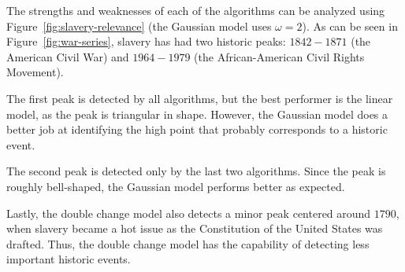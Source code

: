 The strengths and weaknesses of each of the algorithms can be analyzed using Figure~\ref{fig:slavery-relevance} (the Gaussian model uses $\omega = 2$). As can be seen in Figure~\ref{fig:war-series}, slavery has had two historic peaks: $1842 - 1871$ (the American Civil War) and $1964 - 1979$ (the African-American Civil Rights Movement).

The first peak is detected by all algorithms, but the best performer is the linear model, as the peak is triangular in shape. However, the Gaussian model does a better job at identifying the high point that probably corresponds to a historic event.

The second peak is detected only by the last two algorithms. Since the peak is roughly bell-shaped, the Gaussian model performs better as expected.

Lastly, the double change model also detects a minor peak centered around $1790$, when slavery became a hot issue as the Constitution of the United States was drafted. Thus, the double change model has the capability of detecting less important historic events.
